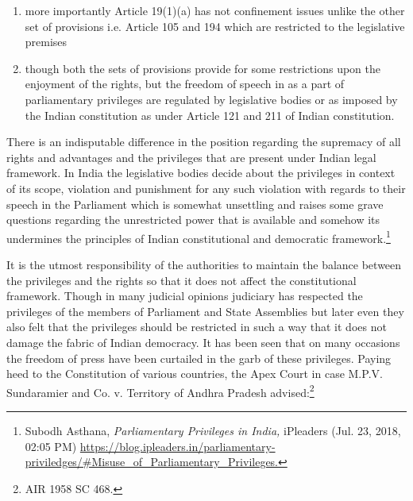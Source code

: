 \begin{multicols}{2}
\begin{enumerate}[label=$\bullet$]
\item more importantly Article 19(1)(a) has not confinement issues unlike the other set of
provisions i.e. Article 105 and 194 which are restricted to the legislative premises

\item though both the sets of provisions provide for some restrictions upon the enjoyment
of the rights, but the freedom of speech in as a part of parliamentary privileges are
regulated by legislative bodies or as imposed by the Indian constitution as under
Article 121 and 211 of Indian constitution.
\end{enumerate}

\vspace{-.3cm}


\vspace{-.2cm}

\noi
There is an indisputable difference in the position regarding the supremacy of all rights and
advantages and the privileges that are present under Indian legal framework. In India the
legislative bodies decide about the privileges in context of its scope, violation and
punishment for any such violation with regards to their speech in the Parliament which is
somewhat unsettling and raises some grave questions regarding the unrestricted power that is
available and somehow its undermines the principles of Indian constitutional and democratic
framework.\footnote{Subodh Asthana, \textit{Parliamentary Privileges in India,} iPleaders (Jul. 23, 2018, 02:05 PM)
 \url{https://blog.ipleaders.in/parliamentary-priviledges/#Misuse_of_Parliamentary_Privileges.}}

\noi
It is the utmost responsibility of the authorities to maintain the balance between the privileges
and the rights so that it does not affect the constitutional framework. Though in many judicial
opinions judiciary has respected the privileges of the members of Parliament and State
Assemblies but later even they also felt that the privileges should be restricted in such a way
that it does not damage the fabric of Indian democracy. It has been seen that on many
occasions the freedom of press have been curtailed in the garb of these privileges. Paying
heed to the Constitution of various countries, the Apex Court in case M.P.V. Sundaramier
and Co. v. Territory of Andhra Pradesh advised:\footnote{AIR 1958 SC 468.}

\vspace{-.4cm}


\end{multicols}

